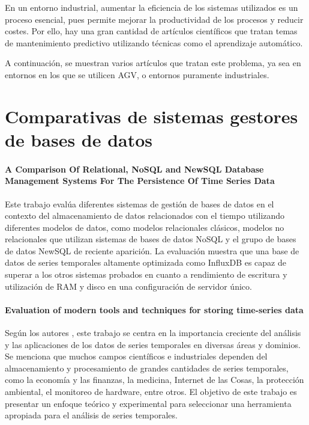 
En un entorno industrial, aumentar la eficiencia de los sistemas utilizados es un proceso esencial, pues permite 
mejorar la productividad de los procesos y reducir costes. Por ello, hay una gran cantidad de artículos científicos 
que tratan temas de mantenimiento predictivo utilizando técnicas como el aprendizaje automático.

A continuación, se muestran varios artículos que tratan este problema, ya sea en entornos en los que se utilicen
AGV, o entornos puramente industriales.

\section{Comparativas de sistemas gestores de bases de datos}

\paragraph{A Comparison Of Relational, NoSQL and NewSQL Database Management Systems For The Persistence Of Time Series Data}

Este trabajo \cite{9988333} evalúa diferentes sistemas de gestión de bases de datos en el contexto del almacenamiento de 
datos relacionados con el tiempo utilizando diferentes modelos de datos, como modelos relacionales clásicos, modelos no 
relacionales que utilizan sistemas de bases de datos NoSQL y el grupo de bases de datos NewSQL de reciente aparición. 
La evaluación muestra que una base de datos de series temporales altamente optimizada como InfluxDB es capaz de superar 
a los otros sistemas probados en cuanto a rendimiento de escritura y utilización de RAM y disco en una configuración de 
servidor único.

\paragraph{Evaluation of modern tools and techniques for storing time-series data}

Según los autores \cite{STRUCKOV201919}, este trabajo se centra en la importancia creciente del análisis y las aplicaciones 
de los datos de series temporales en diversas áreas y dominios. Se menciona que muchos campos científicos e industriales 
dependen del almacenamiento y procesamiento de grandes cantidades de series temporales, como la economía y las finanzas, 
la medicina, Internet de las Cosas, la protección ambiental, el monitoreo de hardware, entre otros. El objetivo de este 
trabajo es presentar un enfoque teórico y experimental para seleccionar una herramienta apropiada para el análisis de 
series temporales.

